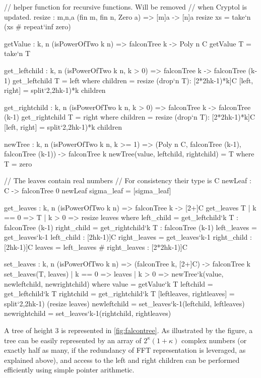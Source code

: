 \begin{code}
  // helper function for recursive functions. Will be removed
  // when Cryptol is updated.
  resize : {m,n,a} (fin m, fin n, Zero a) => [m]a -> [n]a
  resize xs = take`{n} (xs # repeat`{inf} zero)

  getValue : {k, n} (isPowerOfTwo k n) => falconTree k -> Poly n C
  getValue T = take`{n} T
	
  get_leftchild : {k, n} (isPowerOfTwo k n, k > 0) =>
    falconTree k -> falconTree (k-1)
  get_leftchild T = left where
    children = resize (drop`{n} T): [2*2^^(k-1)*k]C
    [left, right] = split`{2,2^^(k-1)*k} children
	
  get_rightchild : {k, n} (isPowerOfTwo k n, k > 0) =>
    falconTree k -> falconTree (k-1)
  get_rightchild T = right where
    children = resize (drop`{n} T): [2*2^^(k-1)*k]C
    [left, right] = split`{2,2^^(k-1)*k} children
		
  newTree : {k, n} (isPowerOfTwo k n, k >= 1) =>
    (Poly n C, falconTree (k-1), falconTree (k-1)) -> falconTree k
  newTree(value, leftchild, rightchild) = T where
    T = zero
	
  // The leaves contain real numbers
  // For consistency their type is C
  newLeaf : C -> falconTree 0
  newLeaf sigma_leaf = [sigma_leaf]
\end{code}

\begin{code}  
  get_leaves : {k, n} (isPowerOfTwo k n) =>
    falconTree k -> [2^^k]C 
  get_leaves T
    | k == 0 => T
    | k >  0 => resize leaves where
        left_child = get_leftchild`{k} T : falconTree (k-1)
        right_child = get_rightchild`{k} T : falconTree (k-1)
        left_leaves  = get_leaves`{k-1} left_child : [2^^(k-1)]C
        right_leaves  = get_leaves`{k-1} right_child : [2^^(k-1)]C
        leaves = left_leaves # right_leaves : [2*2^^(k-1)]C
	
  set_leaves : {k, n} (isPowerOfTwo k n) =>
    (falconTree k, [2^^k]C) -> falconTree k
  set_leaves(T, leaves)
    | k == 0 => leaves
    | k >  0 => newTree`{k}(value, newleftchild, newrightchild) where 
        value = getValue`{k} T
        leftchild = get_leftchild`{k} T 
        rightchild = get_rightchild`{k} T
        [leftleaves, rightleaves] = split`{2,2^^(k-1)} (resize leaves)
        newleftchild = set_leaves`{k-1}(leftchild, leftleaves)
        newrightchild = set_leaves`{k-1}(rightchild, rightleaves)
\end{code}

 A \falcon tree of height $3$ is represented in \cref{fig:falcontree}. As illustrated by the figure, a \falcon tree can be easily represented by an array of $2^\kappa (1 + \kappa)$ complex numbers (or exactly half as many, if the redundancy of FFT representation is leveraged, as explained above), and access to the left and right children can be performed efficiently using simple pointer arithmetic.

